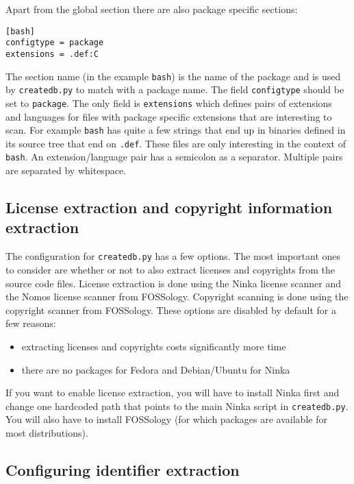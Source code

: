 \documentclass[10pt]{article}
\begin{document}
Apart from the global section there are also package specific sections:

\begin{verbatim}
[bash]
configtype = package
extensions = .def:C
\end{verbatim}

The section name (in the example \texttt{bash}) is the name of the package and
is used by \texttt{createdb.py} to match with a package name. The field
\texttt{configtype} should be set to \texttt{package}. The only field is
\texttt{extensions} which defines pairs of extensions and languages for files
with package specific extensions that are interesting to scan. For example
\texttt{bash} has quite a few strings that end up in binaries defined in its
source tree that end on \texttt{.def}. These files are only interesting in the
context of \texttt{bash}. An extension/language pair has a semicolon as a
separator. Multiple pairs are separated by whitespace.

\subsection{License extraction and copyright information extraction}

The configuration for \texttt{createdb.py} has a few options. The most important
ones to consider are whether or not to also extract licenses and copyrights from
the source code files.  License extraction is done using the Ninka license
scanner and the Nomos license scanner from FOSSology. Copyright scanning is done
using the copyright scanner from FOSSology. These options are disabled
by default for a few reasons:

\begin{itemize}
\item extracting licenses and copyrights costs significantly more time
\item there are no packages for Fedora and Debian/Ubuntu for Ninka
\end{itemize}

If you want to enable license extraction, you will have to install Ninka first
and change one hardcoded path that points to the main Ninka script in
\texttt{createdb.py}. You will also have to install FOSSology
(for which packages are available for most distributions).

\subsection{Configuring identifier extraction}
\end{document}
